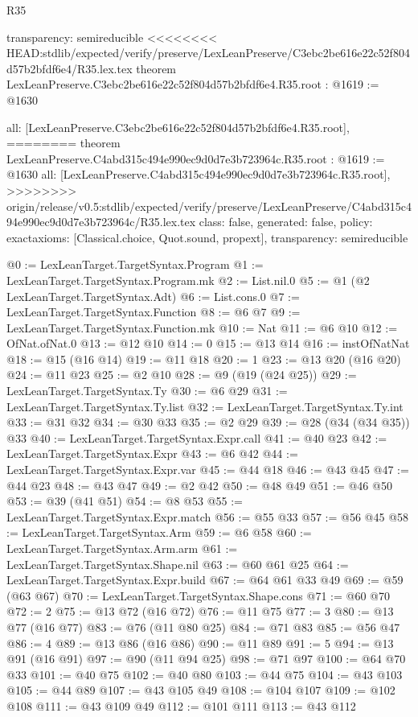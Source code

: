 \begin{lexlean}{R35}
\begin{coremodule}
{{{{{{{{{{{{  transparency: semireducible
}
<<<<<<<< HEAD:stdlib/expected/verify/preserve/LexLeanPreserve/C3ebc2be616e22c52f804d57b2bfdf6e4/R35.lex.tex
theorem LexLeanPreserve.C3ebc2be616e22c52f804d57b2bfdf6e4.R35.root : @1619 := @1630 {
  all: [LexLeanPreserve.C3ebc2be616e22c52f804d57b2bfdf6e4.R35.root],
========
theorem LexLeanPreserve.C4abd315c494e990ec9d0d7e3b723964c.R35.root : @1619 := @1630 {
  all: [LexLeanPreserve.C4abd315c494e990ec9d0d7e3b723964c.R35.root],
>>>>>>>> origin/release/v0.5:stdlib/expected/verify/preserve/LexLeanPreserve/C4abd315c494e990ec9d0d7e3b723964c/R35.lex.tex
  class: false,
  generated: false,
  policy: exact{axioms: [Classical.choice, Quot.sound, propext]},
  transparency: semireducible
}

@0 := LexLeanTarget.TargetSyntax.Program
@1 := LexLeanTarget.TargetSyntax.Program.mk
@2 := List.nil.{0}
@5 := @1 (@2 LexLeanTarget.TargetSyntax.Adt)
@6 := List.cons.{0}
@7 := LexLeanTarget.TargetSyntax.Function
@8 := @6 @7
@9 := LexLeanTarget.TargetSyntax.Function.mk
@10 := Nat
@11 := @6 @10
@12 := OfNat.ofNat.{0}
@13 := @12 @10
@14 := 0
@15 := @13 @14
@16 := instOfNatNat
@18 := @15 (@16 @14)
@19 := @11 @18
@20 := 1
@23 := @13 @20 (@16 @20)
@24 := @11 @23
@25 := @2 @10
@28 := @9 (@19 (@24 @25))
@29 := LexLeanTarget.TargetSyntax.Ty
@30 := @6 @29
@31 := LexLeanTarget.TargetSyntax.Ty.list
@32 := LexLeanTarget.TargetSyntax.Ty.int
@33 := @31 @32
@34 := @30 @33
@35 := @2 @29
@39 := @28 (@34 (@34 @35)) @33
@40 := LexLeanTarget.TargetSyntax.Expr.call
@41 := @40 @23
@42 := LexLeanTarget.TargetSyntax.Expr
@43 := @6 @42
@44 := LexLeanTarget.TargetSyntax.Expr.var
@45 := @44 @18
@46 := @43 @45
@47 := @44 @23
@48 := @43 @47
@49 := @2 @42
@50 := @48 @49
@51 := @46 @50
@53 := @39 (@41 @51)
@54 := @8 @53
@55 := LexLeanTarget.TargetSyntax.Expr.match
@56 := @55 @33
@57 := @56 @45
@58 := LexLeanTarget.TargetSyntax.Arm
@59 := @6 @58
@60 := LexLeanTarget.TargetSyntax.Arm.arm
@61 := LexLeanTarget.TargetSyntax.Shape.nil
@63 := @60 @61 @25
@64 := LexLeanTarget.TargetSyntax.Expr.build
@67 := @64 @61 @33 @49
@69 := @59 (@63 @67)
@70 := LexLeanTarget.TargetSyntax.Shape.cons
@71 := @60 @70
@72 := 2
@75 := @13 @72 (@16 @72)
@76 := @11 @75
@77 := 3
@80 := @13 @77 (@16 @77)
@83 := @76 (@11 @80 @25)
@84 := @71 @83
@85 := @56 @47
@86 := 4
@89 := @13 @86 (@16 @86)
@90 := @11 @89
@91 := 5
@94 := @13 @91 (@16 @91)
@97 := @90 (@11 @94 @25)
@98 := @71 @97
@100 := @64 @70 @33
@101 := @40 @75
@102 := @40 @80
@103 := @44 @75
@104 := @43 @103
@105 := @44 @89
@107 := @43 @105 @49
@108 := @104 @107
@109 := @102 @108
@111 := @43 @109 @49
@112 := @101 @111
@113 := @43 @112
}}}}}}}}}}}}
\end{coremodule}
\end{lexlean}
